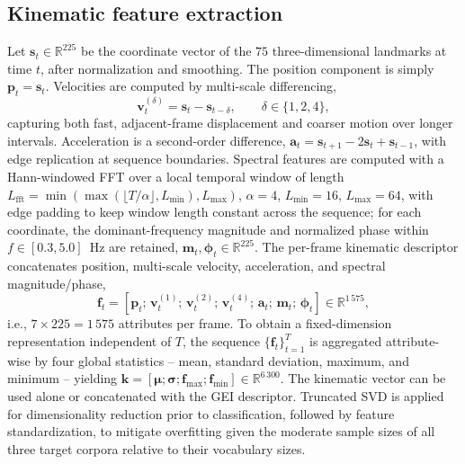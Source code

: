 \documentclass[journal]{IEEEtran}
\begin{document}
\subsection{Kinematic feature extraction}
Let $\mathbf{s}_t\in\mathbb{R}^{225}$ be the coordinate vector of the $75$ three-dimensional landmarks at time $t$, after normalization and smoothing. The position component is simply $\mathbf{p}_t=\mathbf{s}_t$. Velocities are computed by multi-scale differencing,
\begin{equation}
\mathbf{v}_t^{(\delta)} = \mathbf{s}_t - \mathbf{s}_{t-\delta}, \qquad \delta \in \{1,2,4\},
\label{eq:vel}
\end{equation}
capturing both fast, adjacent-frame displacement and coarser motion over longer intervals. Acceleration is a second-order difference, $\mathbf{a}_t = \mathbf{s}_{t+1} - 2\mathbf{s}_t + \mathbf{s}_{t-1}$, with edge replication at sequence boundaries. Spectral features are computed with a Hann-windowed FFT over a local temporal window of length $L_{\mathrm{fft}} = \min(\max(\lfloor T/\alpha\rfloor, L_{\min}), L_{\max})$, $\alpha=4$, $L_{\min}=16$, $L_{\max}=64$, with edge padding to keep window length constant across the sequence; for each coordinate, the dominant-frequency magnitude and normalized phase within $f\in[0.3,5.0]$~Hz are retained, $\mathbf{m}_t,\boldsymbol{\phi}_t\in\mathbb{R}^{225}$. The per-frame kinematic descriptor concatenates position, multi-scale velocity, acceleration, and spectral magnitude/phase,
\begin{equation}
\mathbf{f}_t = \left[\mathbf{p}_t;\, \mathbf{v}_t^{(1)};\, \mathbf{v}_t^{(2)};\, \mathbf{v}_t^{(4)};\, \mathbf{a}_t;\, \mathbf{m}_t;\, \boldsymbol{\phi}_t\right] \in \mathbb{R}^{1\,575},
\label{eq:kin_frame}
\end{equation}
i.e., $7\times225=1\,575$ attributes per frame. To obtain a fixed-dimension representation independent of $T$, the sequence $\{\mathbf{f}_t\}_{t=1}^{T}$ is aggregated attribute-wise by four global statistics -- mean, standard deviation, maximum, and minimum -- yielding $\mathbf{k}=[\boldsymbol{\mu};\boldsymbol{\sigma};\mathbf{f}_{\max};\mathbf{f}_{\min}]\in\mathbb{R}^{6\,300}$. The kinematic vector can be used alone or concatenated with the GEI descriptor. Truncated SVD is applied for dimensionality reduction prior to classification, followed by feature standardization, to mitigate overfitting given the moderate sample sizes of all three target corpora relative to their vocabulary sizes.
\end{document}
